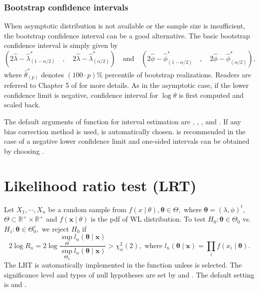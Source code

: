 \subsubsection{Bootstrap confidence intervals}
When asymptotic distribution is not available or the sample size is insufficient, the bootstrap confidence interval can be a good alternative. The basic bootstrap confidence interval is simply given by
$$\left(2\widehat{\lambda}-\widehat{\lambda}^{*}_{(1-\alpha/2)}\quad,\quad 2\widehat{\lambda}-\widehat{\lambda}^{*}_{(\alpha/2)}\right)\quad \text{and} \quad \left(2\widehat{\phi}-\widehat{\phi}^{*}_{(1-\alpha/2)}\quad,\quad 2\widehat{\phi}-\widehat{\phi}^{*}_{(\alpha/2)}\right),$$
where $\hat{\theta}^{*}_{(p)}$ denotes $\left(100\cdot p\right)\%$ percentile of bootstrap realizations. Readers are referred to Chapter 5 of \cite{Davison:1997} for more details.
As in the asymptotic case, if the lower confidence limit is negative, confidence interval for $\log\theta$ is first computed and scaled back.

The default arguments of  function for interval estimation are , , , and . If any bias correction method is used,  is automatically chosen.  is recommended in the case of a negative lower confidence limit and one-sided intervals can be obtained by choosing .\\

\section{Likelihood ratio test (LRT)}
Let $X_{1}, \cdots, X_{n}$ be a random sample from $f(x \mid \theta), \boldsymbol{\theta} \in \Theta,$ where $\boldsymbol{\theta}=\left(\lambda,\phi\right)^{t}$, $\Theta \subset {}^{+}\times{}^{+}$ and $f(\mid\theta)$ is the pdf of WL distribution.
To test $H_{0}: \boldsymbol{\theta} \in \Theta_{0}$ vs. $H_{1}: \boldsymbol{\theta} \in \Theta_{0}^{c},$ we reject $H_{0}$ if
\[
2 \log R_{n}=2 \log \frac{\sup _{\Theta} l_{n}(\boldsymbol{\theta} \mid \boldsymbol{x})}{\sup _{\Theta_{0}} l_{n}(\boldsymbol{\theta} \mid \boldsymbol{x})}>\chi_{\alpha}^{2}(2),\text{ where } l_{n}(\boldsymbol{\theta} \mid \boldsymbol{x}) = \prod\limits_{i} f(x_{i}\mid\boldsymbol{\theta}).
\]
The LRT is automatically implemented in the  function unless  is selected. 
The significance level and types of null hypotheses are set by  and . The default setting is  and .  

